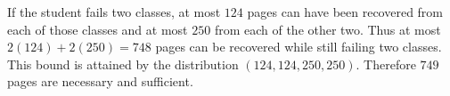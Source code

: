 If the student fails two classes, at most $124$ pages can have been recovered from each of those classes and at most $250$ from each of the other two. Thus at most $2(124)+2(250)=748$ pages can be recovered while still failing two classes.
This bound is attained by the distribution $(124,124,250,250)$. Therefore $\boxed{749}$ pages are necessary and sufficient.
